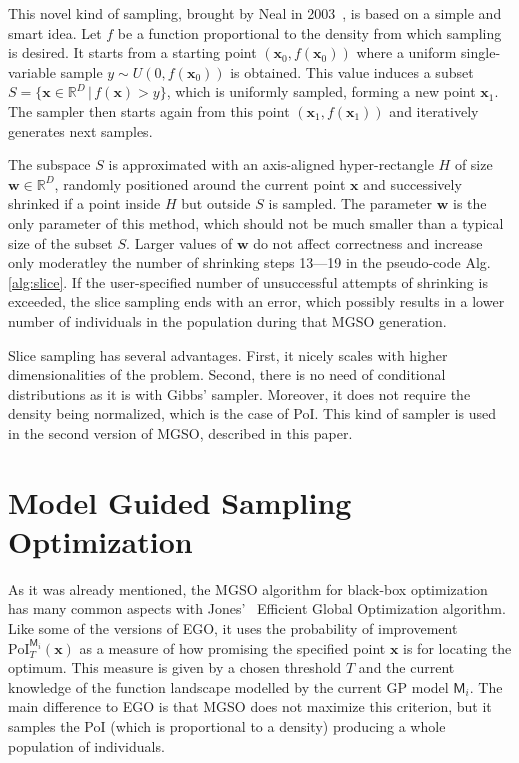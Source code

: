 \documentclass{itatnew}
\newcommand{\xx}{\mathrm{\mathbf{x}}}
\begin{document}
This novel kind of sampling, brought by Neal in 2003~\cite{neal_slice_2003}, is based on a simple and smart idea. Let $f$ be a function proportional to the density from which sampling is desired. It starts from a starting point $(\xx_0, f(\xx_0))$ where a uniform single-variable sample $y \sim U(0,f(\xx_0))$ is obtained. This value induces a subset $S=\{\xx \in \mathbb{R}^D \,|\, f(\xx) > y\}$, which is
uniformly sampled, forming a new point $\xx_1$. The sampler then starts again from this point $(\xx_1, f(\xx_1))$ and iteratively generates next samples.

The subspace $S$ is approximated with an axis-aligned hyper-rectangle $H$ of size $\mathbf{w} \in \mathbb{R}^D$, randomly positioned around the current point $\xx$ and successively shrinked if a point inside $H$ but outside $S$ is sampled. The parameter $\mathbf{w}$ is the only parameter of this method, which should not be much smaller than a typical size of the subset $S$. Larger values of $\mathbf{w}$ do not affect correctness and increase only moderatley the number of shrinking steps 13---19 in the pseudo-code Alg.\,\ref{alg:slice}. If the user-specified number of unsuccessful attempts of shrinking is exceeded, the slice sampling ends with an error, which possibly results in a lower number of individuals in the population during that MGSO generation.

Slice sampling has several advantages. First, it nicely scales with higher dimensionalities of the problem. Second, there is no need of conditional distributions as it is with Gibbs' sampler. Moreover, it does not require the density being normalized, which is the case of PoI. This kind of sampler is used in the second version of MGSO, described in this paper.


\section{Model Guided Sampling Optimization}
\label{sec:mgso}

As it was already mentioned, the MGSO algorithm for black-box optimization has many common aspects with Jones'~\cite{jones_efficient_1998} Efficient Global Optimization algorithm. Like some of the versions of EGO, it uses the probability of improvement $\mathrm{PoI}_T^{\mathsf{M}_i}(\xx)$ as a measure of how promising the specified point $\xx$ is for locating the optimum. This measure is given by a chosen threshold $T$ and the current knowledge of the function landscape
modelled by the current GP model $\mathsf{M}_i$. The main difference to EGO is that MGSO does not maximize this criterion, but it samples the PoI (which is proportional to a density) producing a whole population of individuals. 
\end{document}
